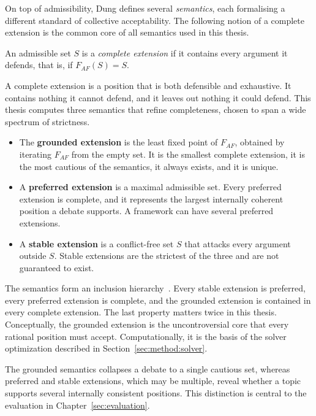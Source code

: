 On top of admissibility, Dung defines several \emph{semantics}, each formalising
a different standard of collective acceptability. The following notion of a
complete extension is the common core of all semantics used in this thesis.

\begin{definition}
An admissible set $S$ is a \emph{complete extension} if it contains every
argument it defends, that is, if $F_{AF}(S) = S$.
\end{definition}

A complete extension is a position that is both defensible and exhaustive. It
contains nothing it cannot defend, and it leaves out nothing it could defend.
This thesis computes three semantics that refine completeness, chosen to span a
wide spectrum of strictness.

\begin{itemize}
  \item The \textbf{grounded extension} is the least fixed point of $F_{AF}$,
    obtained by iterating $F_{AF}$ from the empty set. It is the smallest
    complete extension, it is the most cautious of the semantics, it always
    exists, and it is unique.
  \item A \textbf{preferred extension} is a maximal admissible set. Every
    preferred extension is complete, and it represents the largest internally
    coherent position a debate supports. A framework can have several preferred
    extensions.
  \item A \textbf{stable extension} is a conflict-free set $S$ that attacks every
    argument outside $S$. Stable extensions are the strictest of the three and
    are not guaranteed to exist.
\end{itemize}

The semantics form an inclusion hierarchy~\cite{dung1995}. Every stable
extension is preferred, every preferred extension is complete, and the grounded
extension is contained in every complete extension. The last property matters
twice in this thesis. Conceptually, the grounded extension is the uncontroversial
core that every rational position must accept. Computationally, it is the basis
of the solver optimization described in Section~\ref{sec:method:solver}.

The grounded semantics collapses a debate to a single cautious set, whereas
preferred and stable extensions, which may be multiple, reveal whether a topic
supports several internally consistent positions. This distinction is central to
the evaluation in Chapter~\ref{sec:evaluation}.

